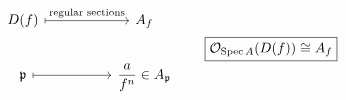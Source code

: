 \[
\begin{tikzcd}[column sep=huge]
D(f) \arrow[r, mapsto, "\text{regular sections}"] & A_f \\
\mfp \arrow[r, mapsto] & \displaystyle \frac{a}{f^n}\in A_{\mfp}
\end{tikzcd}
\qquad
\boxed{\OO_{\Spec A}(D(f))\cong A_f}
\]
